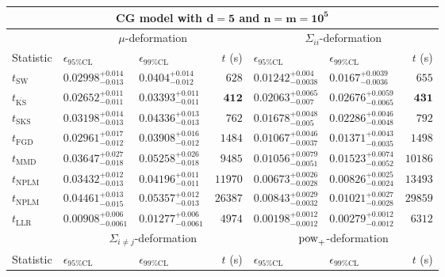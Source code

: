 \begin{tabular}{l|llr|llr}
	\toprule
	\multicolumn{7}{c}{{\bf CG model with $\mathbf{d=5}$ and $\mathbf{n=m=10^{5}}$}} \\
	\toprule
	\multicolumn{1}{c}{} & \multicolumn{3}{c}{$\mu$-deformation} & \multicolumn{3}{c}{$\Sigma_{ii}$-deformation} \\
	Statistic & $\epsilon_{95\%\mathrm{CL}}$ & $\epsilon_{99\%\mathrm{CL}}$ & $t$ (s) & $\epsilon_{95\%\mathrm{CL}}$ & $\epsilon_{99\%\mathrm{CL}}$ & $t$ (s) \\
	\midrule
	$t_{\mathrm{SW}}$ & $0.02998_{-0.013}^{+0.014}$ & $0.0404_{-0.012}^{+0.014}$ & $628$ & $0.01242_{-0.0038}^{+0.004}$ & $0.0167_{-0.0036}^{+0.0039}$ & $655$ \\
	$t_{\overline{\mathrm{KS}}}$ & ${\mathbf{0.02652_{-0.011}^{+0.011}}}$ & ${\mathbf{0.03393_{-0.011}^{+0.011}}}$ & ${\mathbf{412}}$ & $0.02063_{-0.007}^{+0.0065}$ & $0.02676_{-0.0065}^{+0.0059}$ & ${\mathbf{431}}$ \\
	$t_{\mathrm{SKS}}$ & $0.03198_{-0.013}^{+0.014}$ & $0.04336_{-0.013}^{+0.013}$ & $762$ & $0.01678_{-0.005}^{+0.0048}$ & $0.02286_{-0.0048}^{+0.0046}$ & $792$ \\
	$t_{\mathrm{FGD}}$ & $0.02961_{-0.012}^{+0.017}$ & $0.03908_{-0.012}^{+0.016}$ & $1484$ & $0.01067_{-0.0037}^{+0.0046}$ & ${\mathbf{0.01371_{-0.0035}^{+0.0043}}}$ & $1498$ \\
	$t_{\mathrm{MMD}}$ & $0.03647_{-0.018}^{+0.027}$ & $0.05258_{-0.018}^{+0.026}$ & $9485$ & ${\mathbf{0.01056_{-0.0051}^{+0.0079}}}$ & $0.01523_{-0.0052}^{+0.0074}$ & $10186$ \\
\rowcolor{red!35}	$t_{\mathrm{NPLM}}$ & $0.03432_{-0.013}^{+0.012}$ & $0.04196_{-0.011}^{+0.011}$ & $11970$ & $0.00673_{-0.0028}^{+0.0026}$ & $0.00826_{-0.0024}^{+0.0025}$ & $13493$ \\
\rowcolor{blue!35}	$t_{\mathrm{NPLM}}$ & $0.04461_{-0.015}^{+0.013}$ & $0.05357_{-0.013}^{+0.012}$ & $26387$ & $0.00843_{-0.0032}^{+0.0029}$ & $0.01021_{-0.0028}^{+0.0027}$ & $29859$ \\
	$t_{\mathrm{LLR}}$ & $0.00908_{-0.0061}^{+0.006}$ & $0.01277_{-0.0061}^{+0.006}$ & $4974$ & $0.00198_{-0.0012}^{+0.0012}$ & $0.00279_{-0.0012}^{+0.0012}$ & $6312$ \\
	\toprule
	\multicolumn{1}{c}{} & \multicolumn{3}{c}{$\Sigma_{i\neq j}$-deformation} & \multicolumn{3}{c}{$\rm{pow}_{+}$-deformation} \\
	Statistic & $\epsilon_{95\%\mathrm{CL}}$ & $\epsilon_{99\%\mathrm{CL}}$ & $t$ (s) & $\epsilon_{95\%\mathrm{CL}}$ & $\epsilon_{99\%\mathrm{CL}}$ & $t$ (s) \\

\end{tabular}
